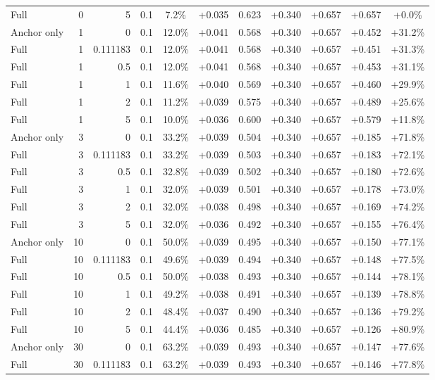 \begin{table}[htbp]
\begin{tabular}{lrrrccccccc}
Full & 0 & 5 & 0.1 & 7.2\% & +0.035 & 0.623 & +0.340 & +0.657 & +0.657 & +0.0\% \\
Anchor only & 1 & 0 & 0.1 & 12.0\% & +0.041 & 0.568 & +0.340 & +0.657 & +0.452 & +31.2\% \\
Full & 1 & 0.111183 & 0.1 & 12.0\% & +0.041 & 0.568 & +0.340 & +0.657 & +0.451 & +31.3\% \\
Full & 1 & 0.5 & 0.1 & 12.0\% & +0.041 & 0.568 & +0.340 & +0.657 & +0.453 & +31.1\% \\
Full & 1 & 1 & 0.1 & 11.6\% & +0.040 & 0.569 & +0.340 & +0.657 & +0.460 & +29.9\% \\
Full & 1 & 2 & 0.1 & 11.2\% & +0.039 & 0.575 & +0.340 & +0.657 & +0.489 & +25.6\% \\
Full & 1 & 5 & 0.1 & 10.0\% & +0.036 & 0.600 & +0.340 & +0.657 & +0.579 & +11.8\% \\
Anchor only & 3 & 0 & 0.1 & 33.2\% & +0.039 & 0.504 & +0.340 & +0.657 & +0.185 & +71.8\% \\
Full & 3 & 0.111183 & 0.1 & 33.2\% & +0.039 & 0.503 & +0.340 & +0.657 & +0.183 & +72.1\% \\
Full & 3 & 0.5 & 0.1 & 32.8\% & +0.039 & 0.502 & +0.340 & +0.657 & +0.180 & +72.6\% \\
Full & 3 & 1 & 0.1 & 32.0\% & +0.039 & 0.501 & +0.340 & +0.657 & +0.178 & +73.0\% \\
Full & 3 & 2 & 0.1 & 32.0\% & +0.038 & 0.498 & +0.340 & +0.657 & +0.169 & +74.2\% \\
Full & 3 & 5 & 0.1 & 32.0\% & +0.036 & 0.492 & +0.340 & +0.657 & +0.155 & +76.4\% \\
Anchor only & 10 & 0 & 0.1 & 50.0\% & +0.039 & 0.495 & +0.340 & +0.657 & +0.150 & +77.1\% \\
Full & 10 & 0.111183 & 0.1 & 49.6\% & +0.039 & 0.494 & +0.340 & +0.657 & +0.148 & +77.5\% \\
Full & 10 & 0.5 & 0.1 & 50.0\% & +0.038 & 0.493 & +0.340 & +0.657 & +0.144 & +78.1\% \\
Full & 10 & 1 & 0.1 & 49.2\% & +0.038 & 0.491 & +0.340 & +0.657 & +0.139 & +78.8\% \\
Full & 10 & 2 & 0.1 & 48.4\% & +0.037 & 0.490 & +0.340 & +0.657 & +0.136 & +79.2\% \\
Full & 10 & 5 & 0.1 & 44.4\% & +0.036 & 0.485 & +0.340 & +0.657 & +0.126 & +80.9\% \\
Anchor only & 30 & 0 & 0.1 & 63.2\% & +0.039 & 0.493 & +0.340 & +0.657 & +0.147 & +77.6\% \\
Full & 30 & 0.111183 & 0.1 & 63.2\% & +0.039 & 0.493 & +0.340 & +0.657 & +0.146 & +77.8\% \\

\end{tabular}
\end{table}
